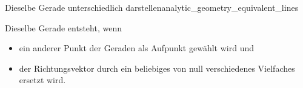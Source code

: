 \begin{ExampleBox}{Dieselbe Gerade unterschiedlich darstellen}{analytic_geometry_equivalent_lines}
  \par\bigskip

  Dieselbe Gerade entsteht, wenn
  \begin{itemize}[leftmargin=1.6em,itemsep=0.4em]
    \item ein anderer Punkt der Geraden als Aufpunkt gewählt wird und
    \item der Richtungsvektor durch ein beliebiges von null verschiedenes
      Vielfaches ersetzt wird.
  \end{itemize}
\end{ExampleBox}
